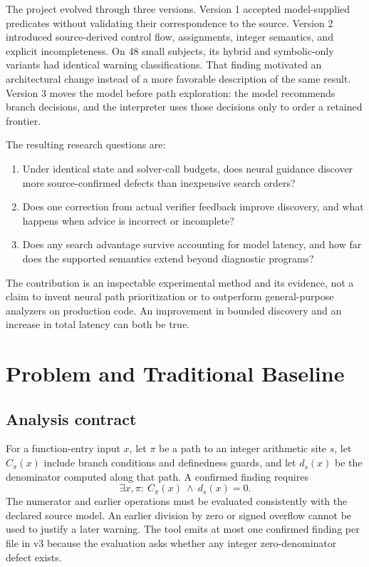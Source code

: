 \documentclass[sigconf]{acmart}
\begin{document}
The project evolved through three versions. Version 1 accepted
model-supplied predicates without validating their correspondence to the
source. Version 2 introduced source-derived control flow, assignments,
integer semantics, and explicit incompleteness. On 48 small subjects,
its hybrid and symbolic-only variants had identical warning classifications.
That finding motivated an architectural change instead of a more favorable
description of the same result. Version 3 moves the model before path
exploration: the model recommends branch decisions, and the interpreter
uses those decisions only to order a retained frontier.

The resulting research questions are:
\begin{enumerate}
\item Under identical state and solver-call budgets, does neural guidance
discover more source-confirmed defects than inexpensive search orders?
\item Does one correction from actual verifier feedback improve discovery,
and what happens when advice is incorrect or incomplete?
\item Does any search advantage survive accounting for model latency, and
how far does the supported semantics extend beyond diagnostic programs?
\end{enumerate}
The contribution is an inspectable experimental method and its evidence,
not a claim to invent neural path prioritization or to outperform
general-purpose analyzers on production code. An improvement in bounded
discovery and an increase in total latency can both be true.

\section{Problem and Traditional Baseline}
\subsection{Analysis contract}
For a function-entry input $x$, let $\pi$ be a path to an integer arithmetic
site $s$, let $C_\pi(x)$ include branch conditions and definedness guards,
and let $d_s(x)$ be the denominator computed along that path. A confirmed
finding requires
\[
  \exists x,\pi:\ C_\pi(x)\ \land\ d_s(x)=0.
\]
The numerator and earlier operations must be evaluated consistently with
the declared source model. An earlier division by zero or signed overflow
cannot be used to justify a later warning. The tool emits at most one
confirmed finding per file in v3 because the evaluation asks whether any
integer zero-denominator defect exists.
\end{document}
